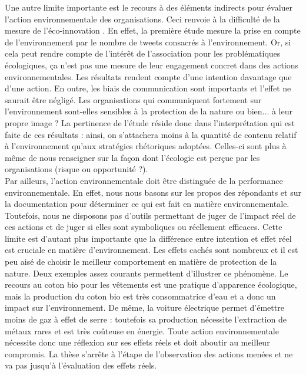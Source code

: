         Une autre limite importante est le recours à des éléments indirects pour évaluer l'action environnementale des organisations. Ceci renvoie à la difficulté de la mesure de l'éco-innovation \parencite{arundel2009measuring, kemp2007final}. En effet, la première étude mesure la prise en compte de l'environnement par le nombre de tweets consacrés à l'environnement. Or, si cela peut rendre compte de l'intérêt de l'association pour les problématiques écologiques, ça n'est pas une mesure de leur engagement concret dans des actions environnementales. Les résultats rendent compte d'une intention davantage que d'une action. En outre, les biais de communication sont importants et l'effet  ne saurait être négligé. Les organisations qui communiquent fortement sur l'environnement sont-elles sensibles à la protection de la nature ou bien... à leur propre image ? La pertinence de l'étude réside donc dans l'interprétation qui est faite de ces résultats : ainsi, on s'attachera moins à la quantité de contenu relatif à l'environnement qu'aux stratégies rhétoriques adoptées. Celles-ci sont plus à même de nous renseigner sur la façon dont l'écologie est perçue par les organisations (risque ou opportunité ?). \\

        Par ailleurs, l'action environnementale doit être distinguée de la performance environnementale. En effet, nous nous basons sur les propos des répondants et sur la documentation pour déterminer ce qui est fait en matière environnementale. Toutefois, nous ne disposons pas d'outils permettant de juger de l'impact réel de ces actions et de juger si elles sont symboliques ou réellement efficaces. Cette limite est d'autant plus importante que la différence entre intention et effet réel est cruciale en matière d'environnement. Les effets cachés sont nombreux et il est peu aisé de choisir le meilleur comportement en matière de protection de la nature. Deux exemples assez courants permettent d'illustrer ce phénomène. Le recours au coton bio pour les vêtements est une pratique d'apparence écologique, mais la production du coton bio est très consommatrice d'eau et a donc un impact sur l'environnement. De même, la voiture électrique permet d'émettre moins de gaz à effet de serre : toutefois sa production nécessite l'extraction de métaux rares et est très coûteuse en énergie. Toute action environnementale nécessite donc une réflexion sur ses effets réels et doit aboutir au meilleur compromis. La thèse s'arrête à l'étape de l'observation des actions menées et ne va pas jusqu'à l'évaluation des effets réels.

